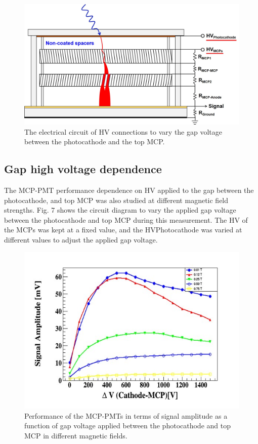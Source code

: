 ﻿\documentclass[preprint,5p]{elsarticle}
\begin{document}
\begin{figure}[tbp]
\centering \includegraphics[scale=0.32]{fig/Figure7.jpg}
\caption{The electrical circuit of HV connections to vary the gap voltage 
   between the photocathode and the top MCP.} \label{fig:design}
\end{figure}

\subsection{Gap high voltage dependence} \label{}
The MCP-PMT performance dependence on HV applied to the gap between the 
photocathode, and top MCP was also studied at different magnetic field 
strengths. Fig. 7 shows the circuit diagram to vary the applied gap voltage 
between the photocathode and top MCP during this measurement. The HV of the 
MCPs was kept at a fixed value, and the HVPhotocathode was varied at different 
values to adjust the applied gap voltage. 

\begin{figure}[tbp]
\centering \includegraphics[scale=0.6]{fig/Figure8.jpg}
\caption{Performance of the MCP-PMTs in terms of signal amplitude as a function 
   of gap voltage applied between the photocathode and top MCP in different 
   magnetic fields.} \label{fig:design}
\end{figure} 
\end{document}
